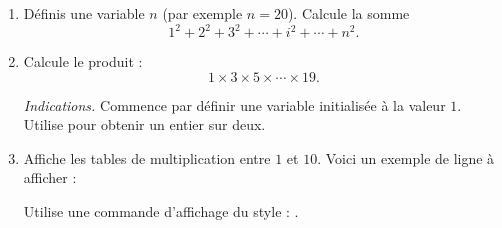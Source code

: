 \documentclass[11pt,class=report,crop=false]{standalone}
\begin{document}

\begin{activite}


\begin{enumerate}
  \item Définis une variable $n$ (par exemple $n=20$). Calcule la somme
  $$1^2+2^2+3^2+\cdots+i^2+\cdots +n^2.$$
  
  \item Calcule le produit :
  $$1 \times 3 \times 5 \times \cdots \times 19.$$
  
  \emph{Indications.} Commence par définir une variable  initialisée à la valeur $1$. Utilise  pour obtenir un entier sur deux.
  
  \item Affiche les tables de multiplication entre $1$ et $10$. Voici un exemple de ligne à afficher :\\
  \centerline{}
  Utilise une commande d'affichage du style : .
\end{enumerate}  
\end{activite}
\end{document}
